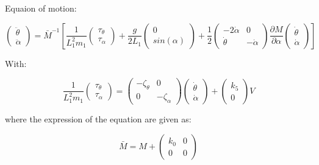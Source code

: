 
Equaion of motion:

\begin{equation}
\left( \begin{matrix}
        \ddot \theta \\
        \ddot \alpha
    \end{matrix} \right) = \bar M^{-1} \left[
\frac{1}{ L_1^2 m_1}
    \left( \begin{matrix}
        \tau_{\theta} \\
        \tau_{\alpha}
    \end{matrix} \right)
    +\frac{g}{2L_1}
    \left( \begin{matrix}
        0 \\
        sin( \alpha)
    \end{matrix} \right)
     + \frac{1}{2} \left( \begin{matrix}
    - 2 \dot \alpha & 0\\
        \dot \theta & -\dot \alpha
    \end{matrix} \right)
    \frac{\partial M}{\partial \alpha}
     \left( \begin{matrix}
        \dot \theta \\
        \dot \alpha
    \end{matrix} \right) \right]
\end{equation}

With:

\begin{equation}
\frac{1}{ L_1^2 m_1}
    \left( \begin{matrix}
        \tau_{\theta} \\
        \tau_{\alpha}
    \end{matrix} \right)
    = \left( \begin{matrix}
        -\zeta_\theta & 0 \\ 0 & -\zeta_\alpha
    \end{matrix}\right)
    \left( \begin{matrix}
        \dot \theta \\ \dot \alpha
    \end{matrix}\right)
    +
    \left( \begin{matrix}
    k_5 \\ 0    
    \end{matrix}\right)
    V
\end{equation}

where the expression of the equation are given as:

\begin{equation}
    \bar M = M + 
    \left( \begin{matrix}
       k_0 & 0 \\ 0 & 0
    \end{matrix} \right)
\end{equation}

